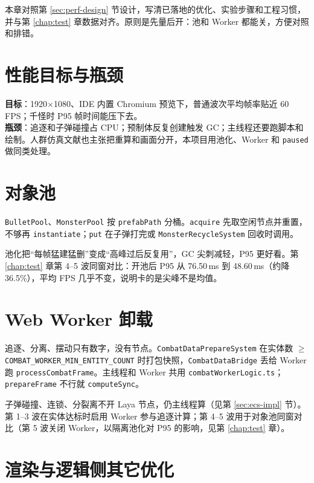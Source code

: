 \documentclass[UTF8,a4paper]{ctexart}
\begin{document}
本章对照第 \ref{sec:perf-design} 节设计，写清已落地的优化、实验步骤和工程习惯，并与第 \ref{chap:test} 章数据对齐。原则是先量后开：池和 Worker 都能关，方便对照和排错。

\section{性能目标与瓶颈}

\textbf{目标}：1920$\times$1080、IDE 内置 Chromium 预览下，普通波次平均帧率贴近 60 FPS；千怪时 P95 帧时间能压下去。\\
\textbf{瓶颈}：追逐和子弹碰撞占 CPU；预制体反复创建触发 GC；主线程还要跑脚本和绘制\cite{gregory2018game,cantrell2018unity}。人群仿真文献也主张把重算和画面分开\cite{cantrell2018unity,bott2014unreal}，本项目用池化、Worker 和 \texttt{paused} 做同类处理。

\section{对象池}

\texttt{BulletPool}、\texttt{MonsterPool} 按 \texttt{prefabPath} 分桶。\texttt{acquire} 先取空闲节点并重置，不够再 \texttt{instantiate}；\texttt{put} 在子弹打完或 \texttt{MonsterRecycleSystem} 回收时调用。

池化把“每帧猛建猛删”变成“高峰过后反复用”，GC 尖刺减轻，P95 更好看。第 \ref{chap:test} 章第 4--5 波同窗对比：开池后 P95 从 76.50\,ms 到 48.60\,ms（约降 36.5\%），平均 FPS 几乎不变，说明卡的是尖峰不是均值。

\section{Web Worker 卸载}

追逐、分离、摆动只有数字，没有节点。\texttt{CombatDataPrepareSystem} 在实体数 $\geq$ \texttt{COMBAT\_WORKER\_MIN\_ENTITY\_COUNT} 时打包快照，\texttt{CombatDataBridge} 丢给 Worker 跑 \texttt{processCombatFrame}。主线程和 Worker 共用 \texttt{combatWorkerLogic.ts}；\texttt{prepareFrame} 不行就 \texttt{computeSync}。

子弹碰撞、连锁、分裂离不开 Laya 节点，仍主线程算（见第 \ref{sec:ecs-impl} 节）。第 1--3 波在实体达标时启用 Worker 参与追逐计算；第 4--5 波用于对象池同窗对比（第 5 波关闭 Worker，以隔离池化对 P95 的影响，见第 \ref{chap:test} 章）。

\section{渲染与逻辑侧其它优化}
\end{document}
